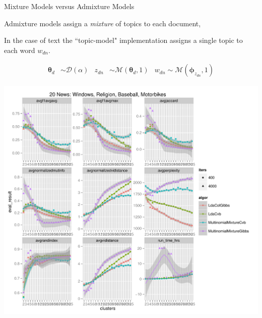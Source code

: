 \documentclass[xcolor=dvipsnames]{beamer}
\newcommand \vv[1] { \boldsymbol #1 }
\newcommand \mul[1]   { \mathcal{M} \left( {#1} \right) }
\newcommand \muln[2]  { \mathcal{M} \left( {#1},{#2} \right) }
\newcommand \dir[1]   { \mathcal{D} \left( {#1} \right) }
\newcommand \dir[1]   { \mathcal{D} \left( {#1} \right) }
\begin{document}
\begin{frame}{Mixture Models versus Admixture Models}
 {
Admixture models assign a \emph{mixture} of topics to each document, 

In the case of text the ``topic-model" implementation\cite{BleiNgJordan2003} assigns a single topic to each word $w_{dn}$.

\begin{align*}
\vv{\theta}_d & \sim \dir{\alpha} & z_{dn} & \sim \muln{\vv{\theta}_d}{1} & w_{dn} \sim \mul{\vv{\phi}_{z_{dn}},1}
\end{align*}

}

 {
    \includegraphics[trim=12.3cm 7.3cm 0.5cm 7.7cm, clip=true, totalwidth=0.8\textwidth]{Images/20news-2013-03-25.pdf}
}

\end{frame}

\end{document}
